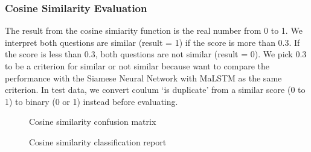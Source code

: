 \documentclass[12pt,oneside,openright,a4paper]{cpe-english-project}
\begin{document}
\subsubsection{Cosine Similarity Evaluation}
The result from the cosine simiarity function is the real number from 0 to 1. We interpret both questions are similar (result = 1) if the  score is more than 0.3. If the score is less than 0.3, both questions are not similar (result = 0). We pick 0.3 to be a criterion for similar or not similar because want to compare the performance with the Siamese Neural Network with MaLSTM as the same criterion. In test data, we convert coulum ‘is duplicate’ from a similar score (0 to 1)  to binary (0 or 1) instead before evaluating.
\begin{figure}[!h]\centering
{}
\caption{Cosine similarity confusion matrix}\label{fig:Cosine Confusion Metrix}
\end{figure} 
\begin{figure}[!h]\centering
{}
\caption{Cosine similarity classification report}\label{fig:Cosine Classification Report}
\end{figure} 
\pagebreak
\end{document}
